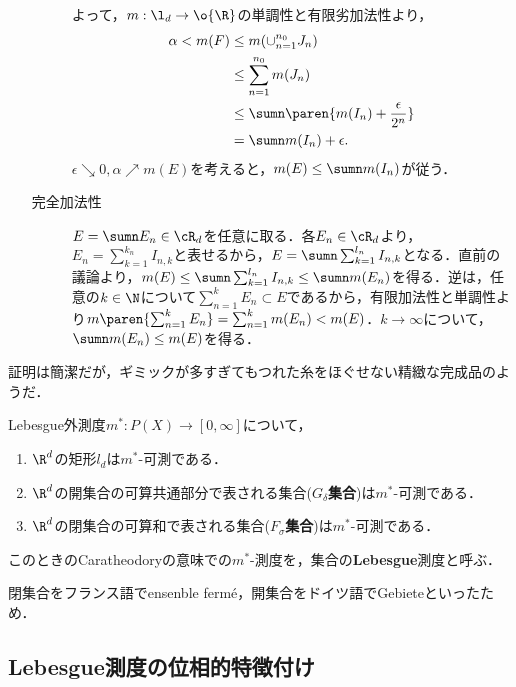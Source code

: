 \documentclass[uplatex, dvipdfmx]{jsreport}
\begin{document}
\begin{Proof}
\begin{enumerate}
\begin{description}
            よって，$m:\l_d\to\o{\R}$の単調性と有限劣加法性より，
            \begin{align*}
                \alpha<m(F)&\le m(\cup_{n=1}^{n_0}J_n)\\
                &\le\sum_{n=1}^{n_0}m(J_n)\\
                &\le\sumn\paren{m(I_n)+\frac{\epsilon}{2^n}}\\
                &=\sumn m(I_n)+\epsilon.
            \end{align*}
            $\epsilon\searrow 0,\alpha\nearrow m(E)$を考えると，$m(E)\le\sumn m(I_n)$が従う．
            \item[完全加法性]
            $E=\sumn E_n\in\cR_d$を任意に取る．各$E_n\in\cR_d$より，$E_n=\sum_{k=1}^{k_n}I_{n,k}$と表せるから，$E=\sumn\sum_{k=1}^{l_n}I_{n,k}$となる．直前の議論より，$m(E)\le\sumn\sum_{k=1}^{l_n}I_{n,k}\le\sumn m(E_n)$を得る．逆は，任意の$k\in\N$について$\sum^k_{n=1}E_n\subset E$であるから，有限加法性と単調性より$m\paren{\sum_{n=1}^kE_n}=\sum_{n=1}^km(E_n)<m(E)$．$k\to\infty$について，$\sumn m(E_n)\le m(E)$を得る．
        \end{description}
    \end{enumerate}
\end{Proof}
\begin{remarks}
    証明は簡潔だが，ギミックが多すぎてもつれた糸をほぐせない精緻な完成品のようだ．
\end{remarks}

\begin{proposition}[Lebesgue可測集合の例]
    Lebesgue外測度$m^*:P(X)\to[0,\infty]$について，
    \begin{enumerate}
        \item $\R^d$の矩形$l_d$は$m^*$-可測である．
        \item $\R^d$の開集合の可算共通部分で表される集合(\textbf{$G_\delta$集合})は$m^*$-可測である．
        \item $\R^d$の閉集合の可算和で表される集合(\textbf{$F_\sigma$集合})は$m^*$-可測である．
    \end{enumerate}
    このときのCaratheodoryの意味での$m^*$-測度を，集合の\textbf{Lebesgue}測度と呼ぶ．
\end{proposition}
\begin{remark}
    閉集合をフランス語でensenble fermé，開集合をドイツ語でGebieteといったため．
\end{remark}

\subsection{Lebesgue測度の位相的特徴付け}
\end{document}
